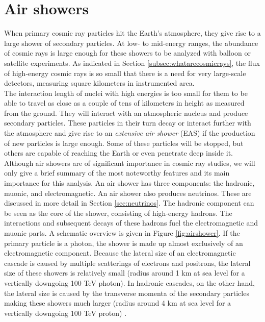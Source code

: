 \section{Air showers}
\label{sec:airshowers}
When primary cosmic ray particles hit the Earth's atmosphere, they give rise to a large shower of secondary particles. At low- to mid-energy ranges, the abundance of cosmic rays is large enough for these showers to be analyzed with balloon or satellite experiments. As indicated in Section \ref{subsec:whatarecosmicrays}, the flux of high-energy cosmic rays is so small that there is a need for very large-scale detectors, measuring square kilometers in instrumented area.\\
\newline
The interaction length of nuclei with high energies is too small for them to be able to travel as close as a couple of tens of kilometers in height as measured from the ground. They will interact with an atmospheric nucleus and produce secondary particles.
These particles in their turn decay or interact further with the atmosphere and give rise to an \textit{extensive air shower} (EAS) if the production of new particles is large enough. Some of these particles will be stopped, but others are capable of reaching the Earth or even penetrate deep inside it. 
Although air showers are of significant importance in cosmic ray studies, we will only give a brief summary of the most noteworthy features and its main importance for this analysis.
An air shower has three components: the hadronic, muonic, and electromagnetic. An air shower also produces neutrinos. These are discussed in more detail in Section \ref{sec:neutrinos}. The hadronic component can be seen as the core of the shower, consisting of high-energy hadrons. The interactions and subsequent decays of these hadrons fuel the electromagnetic and muonic parts. A schematic overview is given in Figure \ref{fig:airshower}. If the primary particle is a photon, the shower is made up almost exclusively of an electromagnetic component. Because the lateral size of an electromagnetic cascade is caused by multiple scatterings of electrons and positrons, the lateral size of these showers is relatively small (radius around 1 km at sea level for a vertically downgoing 100 TeV photon). In hadronic cascades, on the other hand, the lateral size is caused by the transverse momenta of the secondary particles making these showers much larger (radius around 4 km at sea level for a vertically downgoing 100 TeV proton) \cite{Grupen:2005rx}.

